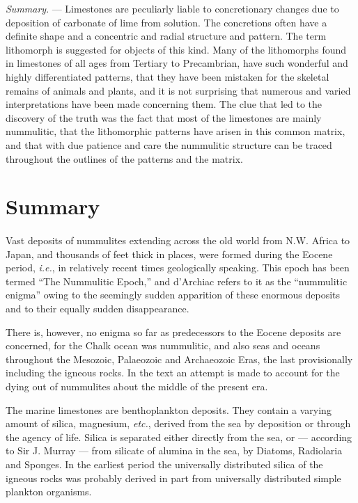 \documentclass[a4paper, 12pt, oneside]{article}
\begin{document}
\emph{Summary}. --- Limestones are peculiarly liable to concretionary changes due to deposition of carbonate of lime from solution. The concretions often have a definite shape and a concentric and radial structure and pattern. The term lithomorph is suggested for objects of this kind. Many of the lithomorphs found in limestones of all ages from Tertiary to Precambrian, have such wonderful and highly differentiated patterns, that they have been mistaken for the skeletal remains of animals and plants, and it is not surprising that numerous and varied interpretations have been made concerning them. The clue that led to the discovery of the truth was the fact that most of the limestones are mainly nummulitic, that the lithomorphic patterns have arisen in this common matrix, and that with due patience and care the nummulitic structure can be traced throughout the outlines of the patterns and the matrix.
\clearpage
\section{Summary}
\paragraph{}
Vast deposits of nummulites extending across the old world from N.W. Africa to Japan, and thousands of feet thick in places, were formed during the Eocene period, \emph{i.e.}, in relatively recent times geologically speaking. This epoch has been termed ``The Nummulitic Epoch,'' and d'Archiac refers to it as the ``nummulitic enigma'' owing to the seemingly sudden apparition of these enormous deposits and to their equally sudden disappearance.

There is, however, no enigma so far as predecessors to the Eocene deposits are concerned, for the Chalk ocean was nummulitic, and also seas and oceans throughout the Mesozoic, Palaeozoic and Archaeozoic Eras, the last provisionally including the igneous rocks. In the text an attempt is made to account for the dying out of nummulites about the middle of the present era.

The marine limestones are benthoplankton deposits. They contain a varying amount of silica, magnesium, \emph{etc.}, derived from the sea by deposition or through the agency of life. Silica is separated either directly from the sea, or --- according to Sir J. Murray --- from silicate of alumina in the sea, by Diatoms, Radiolaria and Sponges. In the earliest period the universally distributed silica of the igneous rocks was probably derived in part from universally distributed simple plankton organisms.
\end{document}
